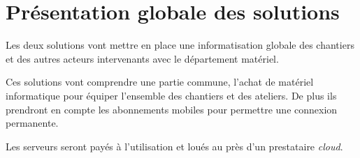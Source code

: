 \section{Présentation globale des solutions}

Les deux solutions vont mettre en place une informatisation globale des 
chantiers et des autres acteurs intervenants avec le département matériel.

Ces solutions vont comprendre une partie commune, l'achat 
de matériel informatique pour équiper l'ensemble des chantiers et des ateliers.
De plus ils prendront en compte les abonnements mobiles pour permettre une connexion
permanente.

Les serveurs seront payés à l'utilisation et loués au près d'un prestataire {\sl cloud}.


